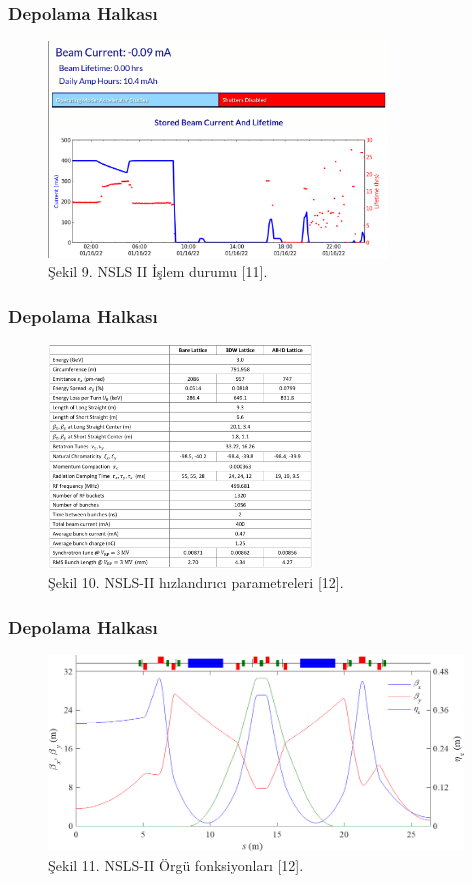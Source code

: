 \documentclass[aspectratio=169,10pt]{beamer}
\begin{document}
\begin{frame}[allowframebreaks]
\frametitle{Depolama Halkası}

	\begin{figure}[h]
 \centering
\includegraphics[width=9cm]{status.png}
\caption*{Şekil 9. NSLS II İşlem durumu [11].}
	\end{figure} 

\end{frame}


\begin{frame}[allowframebreaks]
\frametitle{Depolama Halkası}

	\begin{figure}[h]
 \centering
\includegraphics[width=7cm]{nsls parameter.png}
\caption*{Şekil 10. NSLS-II hızlandırıcı parametreleri [12].}
	\end{figure}

\end{frame}

\begin{frame}[allowframebreaks]
\frametitle{Depolama Halkası}

		\begin{figure}[h]
 \centering
\includegraphics[width=11cm]{latticefunction.png}
\caption*{Şekil 11. NSLS-II Örgü fonksiyonları [12].}
	\end{figure}

\end{frame}
\end{document}
